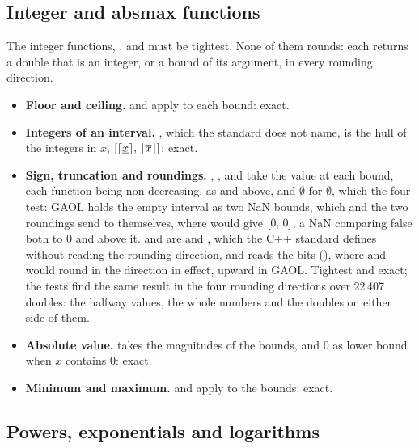 \subsection{Integer and absmax functions}\label{sec:accuracy-integer}

The integer functions, ,  and  must be
tightest. None of them rounds: each returns a double that is an integer, or
a bound of its argument, in every rounding direction.

\begin{itemize}
\item[$\bullet$] \textbf{Floor and ceiling.}  and
   apply to each bound: exact.
\item[$\bullet$] \textbf{Integers of an interval.} , which
  the standard does not name, is the hull of the integers in $x$,
  $[\lceil\underline{x}\rceil,\,\lfloor\overline{x}\rfloor]$: exact.
\item[$\bullet$] \textbf{Sign, truncation and roundings.} ,
  ,  and
   take the value at each bound, each
  function being non-decreasing, as  and  above, and
  $\emptyset$ for $\emptyset$, which the four test: GAOL holds the empty
  interval as two NaN bounds, which  and the two roundings send
  to themselves, where  would give $[0,\,0]$, a NaN comparing
  false both to $0$ and above it.  and
   are  and ,
  which the C++ standard defines without reading the rounding direction,
  and  reads the bits
  (), where  and
   would round in the direction in effect, upward in
  GAOL.\newinvfive{} Tightest and exact; the tests find the same result in
  the four rounding directions over 22\,407 doubles: the halfway values,
  the whole numbers and the doubles on either side of them.
\item[$\bullet$] \textbf{Absolute value.}  takes the magnitudes
  of the bounds, and $0$ as lower bound when $x$ contains $0$: exact.
\item[$\bullet$] \textbf{Minimum and maximum.}  and
   apply to the bounds: exact.
\end{itemize}

\subsection{Powers, exponentials and logarithms}\label{sec:accuracy-powers}

